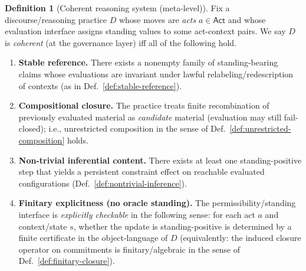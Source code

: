 \documentclass[11pt]{article}
\theoremstyle{definition}
\newtheorem{definition}[theorem]{Definition}
\newcommand{\Act}{\mathsf{Act}}
\begin{document}
\begin{definition}[Coherent reasoning system (meta-level)]
\label{def:coherent-reasoning}
Fix a discourse/reasoning practice $D$ whose moves are \emph{acts} $a\in\Act$ and whose evaluation interface assigns standing values to some act-context pairs.
We say $D$ is \emph{coherent} (at the governance layer) iff all of the following hold.
\begin{enumerate}[label=\textbf{(CR\arabic*)}, leftmargin=2.4em]
\item \textbf{Stable reference.} There exists a nonempty family of standing-bearing claims whose evaluations are invariant under lawful relabeling/redescription of contexts (as in Def.~\ref{def:stable-reference}).
\item \textbf{Compositional closure.} The practice treats finite recombination of previously evaluated material as \emph{candidate} material (evaluation may still fail-closed); i.e., unrestricted composition in the sense of Def.~\ref{def:unrestricted-composition} holds.
\item \textbf{Non-trivial inferential content.} There exists at least one standing-positive step that yields a persistent constraint effect on reachable evaluated configurations (Def.~\ref{def:nontrivial-inference}).
\item \textbf{Finitary explicitness (no oracle standing).} The permissibility/standing interface is \emph{explicitly checkable} in the following sense: for each act $a$ and context/state $s$, whether the update is standing-positive is determined by a finite certificate in the object-language of $D$ (equivalently: the induced closure operator on commitments is finitary/algebraic in the sense of Def.~\ref{def:finitary-closure}).
\end{enumerate}
\end{definition}
\end{document}
